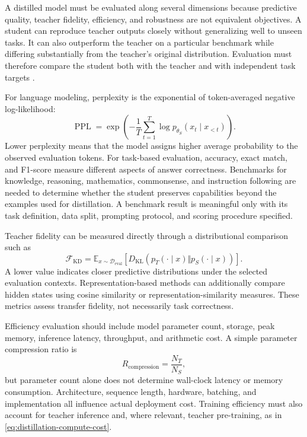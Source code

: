 A distilled model must be evaluated along several dimensions because
predictive quality, teacher fidelity, efficiency, and robustness are not
equivalent objectives.  A student can reproduce teacher outputs closely
without generalizing well to unseen tasks.  It can also outperform the
teacher on a particular benchmark while differing substantially from the
teacher's original distribution.  Evaluation must therefore compare the
student both with the teacher and with independent task targets
\parencite{Yang2024SurveyKD,Fang2026KnowledgeDatasetDistillation}.

For language modeling, perplexity is the exponential of token-averaged
negative log-likelihood:
\begin{equation}
    \operatorname{PPL}
    =\exp\left(
      -\frac{1}{T}\sum_{t=1}^{T}
      \log p_{\theta_S}(x_t\mid x_{<t})
    \right).
    \label{eq:distillation-perplexity}
\end{equation}
Lower perplexity means that the model assigns higher average probability
to the observed evaluation tokens.  For task-based evaluation, accuracy,
exact match, and F1-score measure different aspects of answer correctness.
Benchmarks for knowledge, reasoning, mathematics, commonsense, and
instruction following are needed to determine whether the student preserves
capabilities beyond the examples used for distillation.  A benchmark result
is meaningful only with its task definition, data split, prompting protocol,
and scoring procedure specified.

Teacher fidelity can be measured directly through a distributional
comparison such as
\begin{equation}
    \mathcal F_{\mathrm{KD}}
    =\mathbb E_{x\sim\mathcal D_{\mathrm{eval}}}
    \left[
      D_{\mathrm{KL}}\left(
      p_T(\cdot\mid x)\Vert p_S(\cdot\mid x)
      \right)
    \right].
    \label{eq:distillation-fidelity}
\end{equation}
A lower value indicates closer predictive distributions under the selected
evaluation contexts.  Representation-based methods can additionally compare
hidden states using cosine similarity or representation-similarity measures.
These metrics assess transfer fidelity, not necessarily task correctness.

Efficiency evaluation should include model parameter count, storage,
peak memory, inference latency, throughput, and arithmetic cost.  A simple
parameter compression ratio is
\begin{equation}
    R_{\mathrm{compression}}
    =\frac{N_T}{N_S},
    \label{eq:distillation-compression-ratio}
\end{equation}
but parameter count alone does not determine wall-clock latency or memory
consumption.  Architecture, sequence length, hardware, batching, and
implementation all influence actual deployment cost.  Training efficiency
must also account for teacher inference and, where relevant, teacher
pre-training, as in \cref{eq:distillation-compute-cost}.

